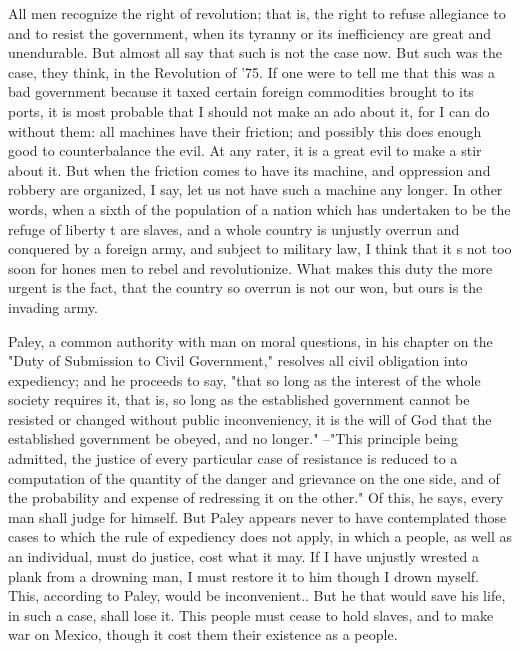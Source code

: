 All men recognize the right of revolution; that is, the right to
refuse allegiance to and to resist the government, when its tyranny or
its inefficiency are great and unendurable. But almost all say that
such is not the case now. But such was the case, they think, in the
Revolution of '75. If one were to tell me that this was a bad government
because it taxed certain foreign commodities brought to its ports, it
is most probable that I should not make an ado about it, for I can do
without them: all machines have their friction; and possibly this does
enough good to counterbalance the evil. At any rater, it is a great
evil to make a stir about it.  But when the friction comes to have its
machine, and oppression and robbery are organized, I say, let us not
have such a machine any longer. In other words, when a sixth of the
population of a nation which has undertaken to be the refuge of liberty
t are slaves, and a whole country is unjustly overrun and conquered by
a foreign army, and subject to military law, I think that it s not too
soon for hones men to rebel and revolutionize. What makes this duty
the more urgent is the fact, that the country so overrun is not our
won, but ours is the invading army.\par 

Paley, a common authority with man on moral questions, in his chapter
on the "Duty of Submission to Civil Government," resolves all civil
obligation into expediency; and he proceeds to say, "that so long as
the interest of the whole society requires it, that is, so long as the
established government cannot be resisted or changed without public
inconveniency, it is the will of God that the established government
be obeyed, and no longer." --"This principle being admitted, the
justice of every particular case of resistance is reduced to a
computation of the quantity of the danger and grievance on the one
side, and of the probability and expense of redressing it on the
other." Of this, he says, every man shall judge for himself. But Paley
appears never to have contemplated those cases to which the rule of
expediency does not apply, in which a people, as well as an
individual, must do justice, cost what it may. If I have unjustly
wrested a plank from a drowning man, I must restore it to him though I
drown myself. This, according to Paley, would be inconvenient.. But he
that would save his life, in such a case, shall lose it. This people
must cease to hold slaves, and to make war on Mexico, though it cost
them their existence as a people.\par


